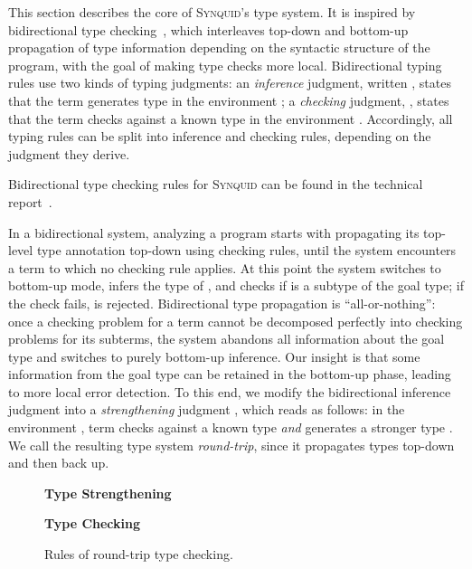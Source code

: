 \documentclass[10pt,preprint]{sigplanconf-pldi16}
\theoremstyle{definition}
\newcommand{\lang}{\textsc{Synquid}\xspace}
\newif\iflong
\begin{document}
This section describes the core of \lang's type system.
It is inspired by bidirectional type checking~\cite{PierceTu00},
which interleaves top-down and bottom-up propagation of type information 
depending on the syntactic structure of the program,
with the goal of making type checks more local.
Bidirectional typing rules use two kinds of typing judgments:
an \emph{inference} judgment, written ,
states that the term  generates type  in the environment ;
a \emph{checking} judgment, ,
states that the term  checks against a known type  in the environment .
Accordingly, all typing rules can be split into inference and checking rules, 
depending on the judgment they derive.
\iflong
Bidirectional type checking rules for \lang are given in \autoref{app:proofs}.
\else
Bidirectional type checking rules for \lang can be found in the technical report~\cite{Techreport}.
\fi

In a bidirectional system, analyzing a program starts with propagating its top-level type annotation top-down using checking rules,
until the system encounters a term  to which no checking rule applies.
At this point the system switches to bottom-up mode, infers the type  of ,
and checks if  is a subtype of the goal type;
if the check fails,  is rejected.
Bidirectional type propagation is ``all-or-nothing'':
once a checking problem for a term cannot be decomposed perfectly into checking problems for its subterms,
the system abandons all information about the goal type and switches to purely bottom-up inference.
Our insight is that some information from the goal type can be retained in the bottom-up phase,
leading to more local error detection.
To this end, we modify the bidirectional inference judgment into a \emph{strengthening} judgment ,
which reads as follows: 
in the environment , term  checks against a known type  \emph{and} generates a stronger type .
We call the resulting type system \emph{round-trip},
since it propagates types top-down and then back up.

\begin{figure}
\small
\textbf{Type Strengthening}\quad


\textbf{Type Checking}\quad

\caption{Rules of round-trip type checking.}\label{fig:round-trip}
\end{figure}
\end{document}
